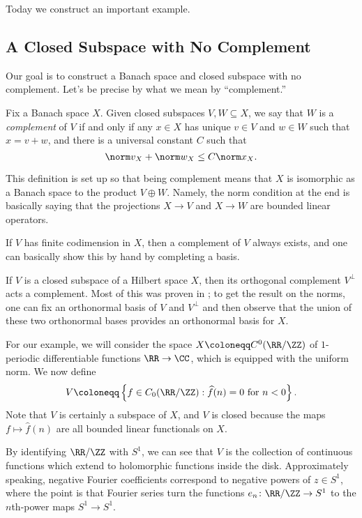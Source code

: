 \documentclass[../notes.tex]{subfiles}
\begin{document}
Today we construct an important example.

\subsection{A Closed Subspace with No Complement}
Our goal is to construct a Banach space and closed subspace with no complement. Let's be precise by what we mean by ``complement.''
\begin{definition}[complement]
	Fix a Banach space $X$. Given closed subspaces $V,W\subseteq X$, we say that $W$ is a \textit{complement} of $V$ if and only if any $x\in X$ has unique $v\in V$ and $w\in W$ such that $x=v+w$, and there is a universal constant $C$ such that
	\[\norm v_X+\norm w_X\le C\norm x_X.\]
\end{definition}
\begin{remark}
	This definition is set up so that being complement means that $X$ is isomorphic as a Banach space to the product $V\oplus W$. Namely, the norm condition at the end is basically saying that the projections $X\to V$ and $X\to W$ are bounded linear operators.
\end{remark}
\begin{example}
	If $V$ has finite codimension in $X$, then a complement of $V$ always exists, and one can basically show this by hand by completing a basis.
\end{example}
\begin{example}
	If $V$ is a closed subspace of a Hilbert space $X$, then its orthogonal complement $V^\perp$ acts a complement. Most of this was proven in ; to get the result on the norms, one can fix an orthonormal basis of $V$ and $V^\perp$ and then observe that the union of these two orthonormal bases provides an orthonormal basis for $X$.
\end{example}
For our example, we will consider the space $X\coloneqq C^0(\RR/\ZZ)$ of $1$-periodic differentiable functions $\RR\to\CC$, which is equipped with the uniform norm. We now define
\[V\coloneqq\left\{f\in C_0(\RR/\ZZ):\widehat f(n)=0\text{ for }n<0\right\}.\]
Note that $V$ is certainly a subspace of $X$, and $V$ is closed because the maps $f\mapsto\widehat f(n)$ are all bounded linear functionals on $X$.
\begin{remark}
	By identifying $\RR/\ZZ$ with $S^1$, we can see that $V$ is the collection of continuous functions which extend to holomorphic functions inside the disk. Approximately speaking, negative Fourier coefficients correspond to negative powers of $z\in S^1$, where the point is that Fourier series turn the functions $e_n\colon\RR/\ZZ\to S^1$ to the $n$th-power maps $S^1\to S^1$.
\end{remark}
\end{document}
